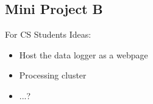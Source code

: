 \subsection{Mini Project B}
For CS Students
Ideas:
\begin{itemize}
    \item Host the data logger as a webpage
    \item Processing cluster
    \item ...?
\end{itemize}